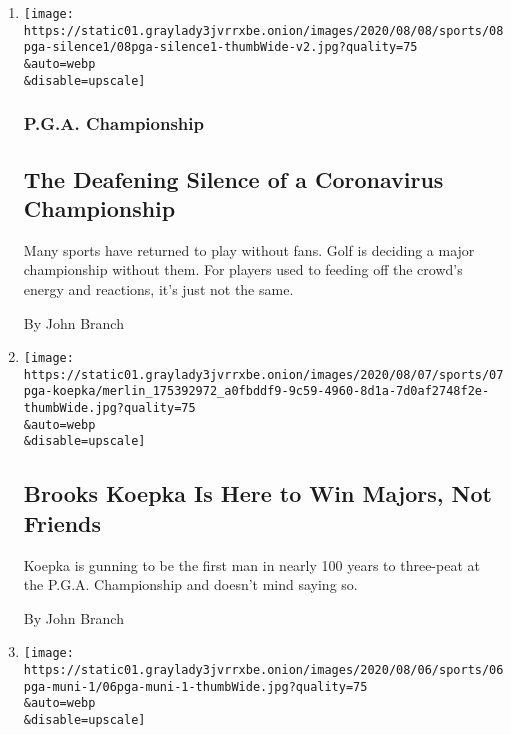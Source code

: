 \begin{enumerate}
\def\labelenumi{\arabic{enumi}.}
\item
  \href{/2020/08/08/sports/golf/pga-championship-scores.html}{}

  \texttt{[image: https://static01.graylady3jvrrxbe.onion/images/2020/08/08/sports/08pga-silence1/08pga-silence1-thumbWide-v2.jpg?quality=75\\\&auto=webp\\\&disable=upscale]}

  \hypertarget{pga-championship}{%
  \subsubsection{P.G.A. Championship}\label{pga-championship}}

  \hypertarget{the-deafening-silence-of-a-coronavirus-championship}{%
  \subsection{The Deafening Silence of a Coronavirus
  Championship}\label{the-deafening-silence-of-a-coronavirus-championship}}

  Many sports have returned to play without fans. Golf is deciding a
  major championship without them. For players used to feeding off the
  crowd's energy and reactions, it's just not the same.

  By John Branch
\item
  \href{/2020/08/07/sports/brooks-koepka-pga-championship.html}{}

  \texttt{[image: https://static01.graylady3jvrrxbe.onion/images/2020/08/07/sports/07pga-koepka/merlin\_175392972\_a0fbddf9-9c59-4960-8d1a-7d0af2748f2e-thumbWide.jpg?quality=75\\\&auto=webp\\\&disable=upscale]}

  \hypertarget{brooks-koepka-is-here-to-win-majors-not-friends}{%
  \subsection{Brooks Koepka Is Here to Win Majors, Not
  Friends}\label{brooks-koepka-is-here-to-win-majors-not-friends}}

  Koepka is gunning to be the first man in nearly 100 years to
  three-peat at the P.G.A. Championship and doesn't mind saying so.

  By John Branch
\item
  \href{/2020/08/06/sports/golf/pga-championship-harding-park.html}{}

  \texttt{[image: https://static01.graylady3jvrrxbe.onion/images/2020/08/06/sports/06pga-muni-1/06pga-muni-1-thumbWide.jpg?quality=75\\\&auto=webp\\\&disable=upscale]}


\end{enumerate}
